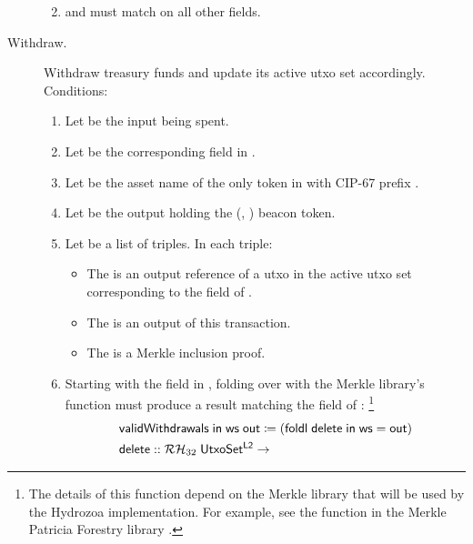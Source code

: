 \documentclass[../hydrozoa.tex]{subfiles}
\begin{document}
\begin{description}
\begin{enumerate}
\begin{enumerate}
        \end{enumerate}
      \item {} and  must match on all other fields.
    \end{enumerate}
  \item[Withdraw.] Withdraw treasury funds and update its active utxo set accordingly.
    Conditions:
    \begin{enumerate}
      \item Let  be the input being spent.
      \item Let  be the corresponding field in .
      \item Let  be the asset name of the only  token in  with CIP-67 prefix \headBeaconToken{}.
      \item Let  be the output holding the (, ) beacon token.
      \item Let  be a list of triples.
      In each triple:
        \begin{itemize}
          \item The  is an output reference of a utxo in the active utxo set corresponding to the  field of .
          \item The  is an output of this transaction.
          \item The  is a Merkle inclusion proof.
        \end{itemize}
      \item Starting with the  field in , folding over  with the Merkle library's  function must produce a result matching the  field of :%
        \footnote{The details of this function depend on the Merkle library that will be used by the Hydrozoa implementation.
        For example, see the  function in the Merkle Patricia Forestry library \citep{MatthiasBenkortMerklePatriciaForestry2024}.}
        \begin{equation*}
        \begin{split}
          &\T{validWithdrawals} \; \T{in} \; \T{ws} \; \T{out} \coloneq
            (\T{foldl} \; \T{delete} \; \T{in} \; \T{ws} = \T{out}) \\
          &\T{delete} ::
            \mathcal{RH}_{32} \; \T{UtxoSet^{L2}} ->

\end{split}
\end{equation*}
\end{enumerate}
\end{description}
\end{document}
